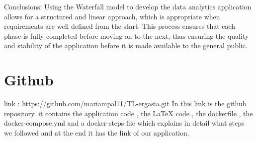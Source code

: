 \documentclass{article}
\begin{document}
Conclusions: 
Using the Waterfall model to develop the data analytics application allows for a structured and linear approach, which is appropriate when requirements are well defined from the start. This process ensures that each phase is fully completed before moving on to the next, thus ensuring the quality and stability of the application before it is made available to the general public.

\section{Github}
link : https://github.com/mariampal11/TL-ergasia.git
In this link is the github repository. it contains the application code , the LaTeX code , the dockerfile , the docker-compose.yml and a docker-steps file which explains in detail what steps we followed and at the end it has the link of our application.
\end{document}
